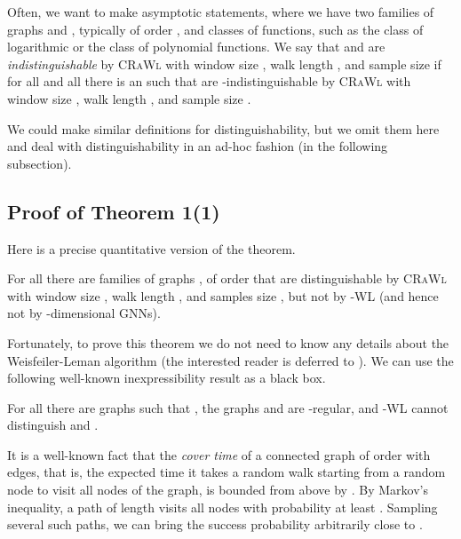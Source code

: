 \documentclass{scrartcl} \usepackage[dvipsnames]{xcolor}
\newcommand{\crawl}{\textsc{CRaWl}}
\begin{document}
Often, we want to make asymptotic statements, where we have two
families of graphs  and , typically of
order , and classes  of functions, such
as the class  of logarithmic or the class  of
polynomial functions. We say that  and
 are \emph{indistinguishable} by \crawl{} with window
size , walk length , and sample size  if for all 
and all  there is an  such that 
are -indistinguishable by \crawl{} with window size ,
walk length , and sample size .

We could make similar definitions for distinguishability, but we omit
them here and deal with distinguishability in an ad-hoc fashion (in
the following subsection). 


\subsection{Proof of Theorem 1(1)}

Here is a precise quantitative version of the theorem.

\begin{theorem}\label{theo:1-1}
  For all  there are families of graphs ,
   of order  that are distinguishable by \crawl{} with
  window size , walk length , and samples size
  , but not by -WL (and hence not by -dimensional GNNs).
\end{theorem}


Fortunately, to prove this theorem we do not need to know any details
about the Weisfeiler-Leman algorithm (the interested reader is
deferred to \cite{kie20}). We can use the following
well-known inexpressibility result as a black box.

\begin{theorem}\label{theo:cfi}
  For all  there are graphs  such that
  , the graphs  and  are -regular, and -WL cannot distinguish  and .
\end{theorem}


It is a well-known fact that the \emph{cover time} of a connected
graph of order  with  edges, that is, the expected time it takes
a random walk starting from a random node to visit all nodes of
the graph, is bounded from above by  \cite{alekarlip+79}. By Markov's
inequality, a path of length  visits all nodes with
probability at least . Sampling several such paths, we can bring
the success probability arbitrarily close to .
\end{document}
